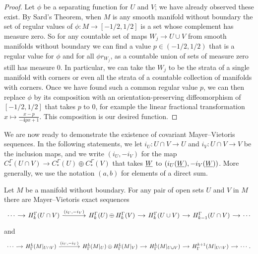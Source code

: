\begin{proof}
	Let $\phi$ be a separating function for $U$ and $V$; we have already observed these exist.
	By Sard's Theorem, when $M$ is any smooth manifold without boundary the set of regular values of $\phi \colon M \to [-1/2,1/2]$ is a set whose complement has measure zero.
	So for any countable set of maps $W_j \to U \cup V$ from smooth manifolds without boundary we can find a value $p \in (-1/2, 1/2)$ that is a regular value for $\phi$ and for all $\phi r_{W_j}$, as a countable union of sets of measure zero still has measure $0$.
	In particular, we can take the $W_j$ to be the strata of a single manifold with corners or even all the strata of a countable collection of manifolds with corners.
    Once we have found such a common regular value $p$, we can then replace $\phi$ by its composition with an orientation-preserving diffeomorphism of $[-1/2,1/2]$ that takes $p$ to $0$, for example the linear fractional transformation $x \mapsto \frac{x-p}{-4px+1}$.
	This composition is our desired function.
\end{proof}


We are now ready to demonstrate the existence of covariant Mayer--Vietoris sequences.
In the following statements, we let $i_U \colon U \cap V \to U$ and $i_V \colon U \cap V \to V$ be the inclusion maps, and we write $(i_U, -i_V)$ for the map $C_*^{\Gamma}(U \cap V) \to C_*^{\Gamma}(U) \oplus C_*^{\Gamma}(V)$ that takes $\underline{W}$ to $(i_U(\underline{W}), -i_V(\underline{W}))$.
More generally, we use the notation $(a,b)$ for elements of a direct sum.


\begin{theorem}\label{T: relative MV}
	Let $M$ be a manifold without boundary.
	For any pair of open sets $U$ and $V$ in $M$ there are Mayer--Vietoris exact sequences
	\begin{equation*}
		\begin{tikzcd}[
			column sep = small,
			arrow style = math font,
			cells = {nodes = {text height = 2ex,text depth = 0.75ex}}
			]
			\cdots \arrow[r] & H^{\Gamma}_{k}(U \cap V) \arrow[r, "(i_U{,} -i_V)"] & [25pt] H^{\Gamma}_k(U) \oplus H^{\Gamma}_{k}(V)
			\arrow[r] & H_{k}^{\Gamma}(U \cup V) \arrow[r] & H_{k-1}^{\Gamma}(U \cap V) \arrow[r] & \cdots
		\end{tikzcd}
	\end{equation*}
	and
	\begin{equation*}
		\begin{tikzcd}[
			column sep = small,
			arrow style = math font,
			cells = {nodes = {text height = 2ex,text depth = 0.75ex}}
			]
			\cdots \arrow[r] & H_{\Gamma}^{k}(M|_{U \cap V}) \arrow[r, "(i_U{,} -i_V)"] & [25pt] H_{\Gamma}^k(M|_U) \oplus H_{\Gamma}^{k}(M|_V)
			\arrow[r] & H^{k}_{\Gamma}(M|_{U \cup V}) \arrow[r] & H^{k+1}_{\Gamma}(M|_{U \cap V}) \arrow[r] & \cdots.
		\end{tikzcd}
	\end{equation*}
\end{theorem}

